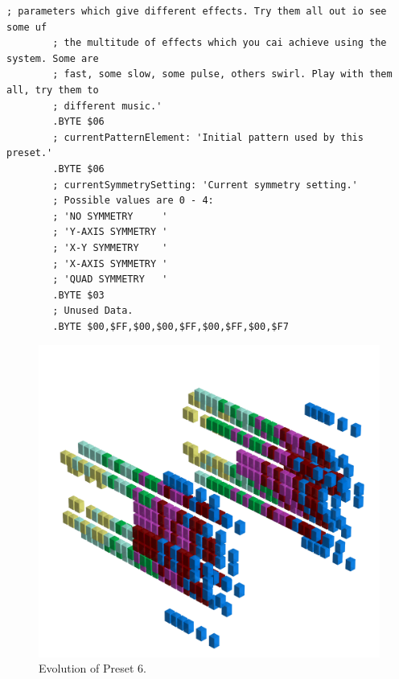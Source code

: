 \begin{lstlisting}[basicstyle=\ttfamily\tiny,caption=Source code for Preset 5.]
        ; parameters which give different effects. Try them all out io see some uf
        ; the multitude of effects which you cai achieve using the system. Some are
        ; fast, some slow, some pulse, others swirl. Play with them all, try them to
        ; different music.'
        .BYTE $06
        ; currentPatternElement: 'Initial pattern used by this preset.'
        .BYTE $06
        ; currentSymmetrySetting: 'Current symmetry setting.'
        ; Possible values are 0 - 4:
        ; 'NO SYMMETRY     '
        ; 'Y-AXIS SYMMETRY '
        ; 'X-Y SYMMETRY    '
        ; 'X-AXIS SYMMETRY '
        ; 'QUAD SYMMETRY   '
        .BYTE $03
        ; Unused Data.
        .BYTE $00,$FF,$00,$00,$FF,$00,$FF,$00,$F7
\end{lstlisting}


\clearpage                                                                 
\begin{figure}[H]                                                          
    \centering                                                             
    \begin{adjustbox}{width=14cm,center}                                   
      \includegraphics[width=14cm]{src/presets/pattern6-45.png}%
    \end{adjustbox}                                                        
\caption{Evolution of Preset 6.}                                           
\end{figure}                                                               
\clearpage                                                                 
                                                                           
